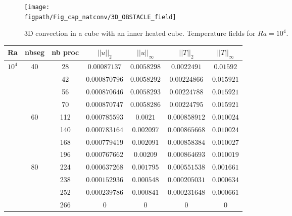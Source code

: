 \begin{figure}%
\begin{minipage}{\linewidth}
\begin{center}
 {\texttt{[image: \\figpath/Fig\_cap\_natconv/3D\_OBSTACLE\_field]}}
\end{center}
\end{minipage}
\caption{3D convection in a cube with an inner heated cube. Temperature fields for $Ra = 10^4$.}
\label{fig-obstacle-Ra1e4} 
\end{figure}

\begin{table}[!h]
	\begin{center}
		\begin{tabular}{|*{7}{c|}}
			\hline
			 Ra & nbseg & nb proc                     & $||u||_{2}$                        & $||u||_{\infty}$                & $||T||_{2}$              & $||T||_{\infty}$\\ \hline \hline
			\multirow{12}{*}{$10^4$} & \multirow{4}{*}{40} & 28 & $0.00087137$ & $0.0058298$ & $ 0.0022491 $ & $0.01592$ \\
			\cline{3-7}
			& & 42 & $0.000870796$ & $0.0058292$ & $ 0.00224866 $ & $0.015921$ \\ \cline{3-7} %
			& & 56 & $0.000870646$ & $0.0058293$ & $ 0.00224788 $ & $0.015921$  \\ \cline{3-7} %
			& & 70 & $0.000870747$ & $0.0058286$ & $ 0.00224795 $ & $0.015921$ \\ \cline{2-7}
			 & \multirow{4}{*}{60} & 112 & $0.000785593$ & $0.0021$ & $ 0.000858912 $ & $0.010024$ \\%
			\cline{3-7}
			& & 140 & $0.000783164$ & $0.002097$ & $ 0.000865668 $ & $0.010024$ \\ \cline{3-7} %
			& & 168 & $0.000779419$ & $0.002091$ & $ 0.000858384 $ & $0.010027$  \\ \cline{3-7} %
			& & 196 & $0.000767662$ & $0.00209$ & $ 0.000864693 $ & $0.010019$ \\ \cline{2-7}
			 & \multirow{4}{*}{80} & 224 & $0.000637268$ & $0.001795$ & $ 0.000551538 $ & $0.001661$ \\%
			\cline{3-7}
			& & 238 & $0.000152936$ & $0.000548$ & $ 0.000205031 $ & $0.000634$ \\ \cline{3-7} %
			& & 252 & $0.000239786$ & $0.000841$ & $ 0.000231648 $ & $0.000661$  \\ \cline{3-7} %
			& & 266 & $0$ & $0$ & $ 0 $ & $0$ \\ \hline 

\end{tabular}
\end{center}
\end{table}
